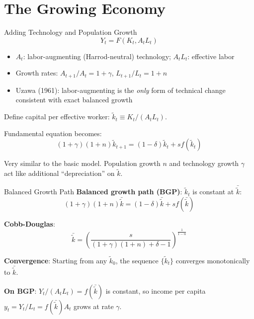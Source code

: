 \documentclass[blue]{beamer}
\begin{document}
\section{The Growing Economy}

\begin{frame}{Adding Technology and Population Growth}
		\vspace{-10pt}
	\[
	Y_t = F(K_t, A_t L_t)
	\]
	\vspace{-20pt}
	\begin{itemize}
		\item $A_t$: labor-augmenting (Harrod-neutral) technology; $A_t L_t$: effective labor
		\item Growth rates: $A_{t+1}/A_t = 1+\gamma$, $L_{t+1}/L_t = 1+n$
		\item Uzawa (1961): labor-augmenting is the \emph{only} form of technical change consistent with exact balanced growth 
	\end{itemize}
	

	Define capital per effective worker: $\tilde{k}_t \equiv K_t/(A_t L_t)$.
	

	Fundamental equation becomes:
	\[
	(1+\gamma)(1+n)\tilde{k}_{t+1} = (1-\delta)\tilde{k}_t + sf(\tilde{k}_t)
	\]
	
	Very similar to the basic model. Population growth $n$ and technology growth $\gamma$ act like additional ``depreciation'' on $\tilde{k}$.
\end{frame}

\begin{frame}{Balanced Growth Path}
	\textbf{Balanced growth path (BGP)}: $\tilde{k}_t$ is constant at $\bar{\tilde{k}}$:
	\[
	(1+\gamma)(1+n)\bar{\tilde{k}} = (1-\delta)\bar{\tilde{k}} + sf(\bar{\tilde{k}})
	\]
	
	\textbf{Cobb-Douglas}:
	\[
	\bar{\tilde{k}} = \left(\frac{s}{(1+\gamma)(1+n) + \delta - 1}\right)^{\frac{1}{1-\alpha}}
	\]
	
	\bigskip
	\textbf{Convergence}: Starting from any $\tilde{k}_0$, the sequence $\{\tilde{k}_t\}$ converges monotonically to $\bar{\tilde{k}}$.
	
	\bigskip
	\textbf{On BGP}: $Y_t/(A_t L_t) = f(\bar{\tilde{k}})$ is constant, so income per capita $y_t = Y_t/L_t = f(\bar{\tilde{k}})A_t$ grows at rate $\gamma$.
\end{frame}
\end{document}
